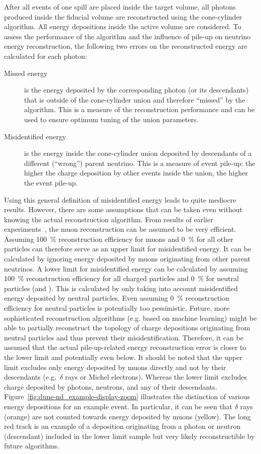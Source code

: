 After all events of one spill are placed inside the target volume, all \Pgpz photons produced inside the fiducial volume are reconstructed using the cone-cylinder algorithm.
All energy depositions inside the active volume are considered.
To assess the performance of the algorithm and the influence of pile-up on neutrino energy reconstruction, the following two errors on the reconstructed energy are calculated for each \Pgpz photon:
\begin{description}
	\item[Missed energy] is the energy deposited by the corresponding \Pgpz photon (or its descendants) that is outside of the cone-cylinder union and therefore ``missed'' by the algorithm.
		This is a measure of the reconstruction performance and can be used to ensure optimum tuning of the union parameters.
	\item[Misidentified energy] is the energy inside the cone-cylinder union deposited by descendants of a different (``wrong'') parent neutrino.
		This is a measure of event pile-up: the higher the charge deposition by other events inside the union, the higher the event pile-up.
\end{description}
Using this general definition of misidentified energy leads to quite mediocre results.
However, there are some assumptions that can be taken even without knowing the actual reconstruction algorithm.
From results of earlier experiments~\cite{pandora}, the muon reconstruction can be assumed to be very efficient.
Assuming \SI{100}{\percent} reconstruction efficiency for muons and \SI{0}{\percent} for all other particles can therefore serve as an upper limit for misidentified energy.
It can be calculated by ignoring energy deposited by muons originating from other parent neutrinos.
A lower limit for misidentified energy can be calculated by assuming \SI{100}{\percent} reconstruction efficiency for all charged particles and \SI{0}{\percent} for neutral particles (\Pgg and \Pn).
This is calculated by only taking into account misidentified energy deposited by neutral particles.
Even assuming \SI{0}{\percent} reconstruction efficiency for neutral particles is potentially too pessimistic.
Future, more sophisticated reconstruction algorithms (e.g. based on machine learning) might be able to partially reconstruct the topology of charge depositions originating from neutral particles and thus prevent their misidentification.
Therefore, it can be assumed that the actual pile-up-related energy reconstruction error is closer to the lower limit and potentially even below.
It should be noted that the upper limit excludes only energy deposited by muons directly and not by their descendants (e.g.\ $\delta$ rays or Michel electrons).
Whereas the lower limit excludes charge deposited by photons, neutrons, and any of their descendants.
Figure~\ref{fig:dune-nd_example-display-zoom} illustrates the distinction of various energy depositions for an example event.
In particular, it can be seen that $\delta$ rays (orange) are not counted towards energy deposited by muons (yellow).
The long red track is an example of a deposition originating from a photon or neutron (descendant) included in the lower limit sample but very likely reconstructible by future algorithms.


